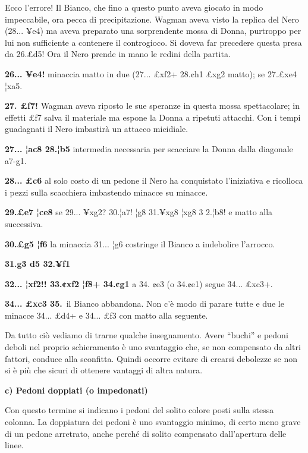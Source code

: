 
Ecco l'errore! Il Bianco, che fino a questo punto aveva giocato in modo
impeccabile, ora pecca di precipitazione. Wagman aveva visto la replica
del Nero (28... ¥e4) ma aveva preparato una sorprendente mossa di Donna,
purtroppo per lui non sufficiente a contenere il controgioco. Si doveva
far precedere questa presa da 26.£d5! Ora il Nero prende in mano le
redini della partita.

\textbf{26... ¥e4!} minaccia matto in due (27... £xf2+ 28.¢h1 £xg2
matto); se 27.£xe4 ¦xa5.

\textbf{27. £f7!} Wagman aveva riposto le sue speranze in questa mossa
spettacolare; in effetti £f7 salva il materiale ma espone la Donna a
ripetuti attacchi. Con i tempi guadagnati il Nero imbastirà un attacco
micidiale.

\textbf{27... ¦ac8 28.¦b5} intermedia necessaria per scacciare la Donna
dalla diagonale a7-g1.

\textbf{28... £c6} al solo costo di un pedone il Nero ha conquistato
l'iniziativa e ricolloca i pezzi sulla scacchiera imbastendo minacce su
minacce.

\textbf{29.£e7 ¦ce8} se 29... ¥xg2? 30.¦a7! ¦g8 31.¥xg8 ¦xg8 3 2.¦b8! e
matto alla successiva.

\textbf{30.£g5 ¦f6} la minaccia 31... ¦g6 costringe il Bianco a
indebolire l'arrocco.


\textbf{31.g3
d5 32.¥f1}

\textbf{32... ¦xf2!! 33.¢xf2 ¦f8+ 34.¢g1} a 34. ¢e3 (o 34.¢e1) segue
34... £xc3+.

\textbf{34... £xc3 35.}~il Bianco abbandona. Non c'è modo di parare
tutte e due le minacce 34... £d4+ e 34... £f3 con matto alla seguente.

Da tutto ciò vediamo di trarne qualche insegnamento. Avere ``buchi'' e
pedoni deboli nel proprio schieramento è uno svantaggio che, se non
compensato da altri fattori, conduce alla sconfitta. Quindi occorre
evitare di crearsi debolezze se non si è più che sicuri di ottenere
vantaggi di altra natura.

\textbf{c) Pedoni doppiati (o impedonati)}

Con questo termine si indicano i pedoni del solito colore posti sulla
stessa colonna. La doppiatura dei pedoni è uno svantaggio minimo, di
certo meno grave di un pedone arretrato, anche perché di solito
compensato dall'apertura delle linee.

